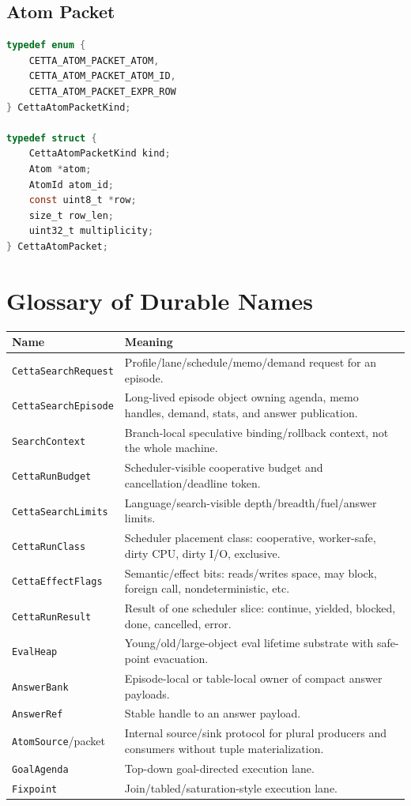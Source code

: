 \documentclass[11pt]{article}
\begin{document}
\subsection{Atom Packet}

\begin{lstlisting}[language=C]
typedef enum {
    CETTA_ATOM_PACKET_ATOM,
    CETTA_ATOM_PACKET_ATOM_ID,
    CETTA_ATOM_PACKET_EXPR_ROW
} CettaAtomPacketKind;

typedef struct {
    CettaAtomPacketKind kind;
    Atom *atom;
    AtomId atom_id;
    const uint8_t *row;
    size_t row_len;
    uint32_t multiplicity;
} CettaAtomPacket;
\end{lstlisting}

\section{Glossary of Durable Names}

\begin{longtable}{>{\raggedright\arraybackslash}p{} >{\raggedright\arraybackslash}p{}}
\toprule
Name & Meaning \\
\midrule
\texttt{CettaSearchRequest} & Profile/lane/schedule/memo/demand request for an episode. \\
\texttt{CettaSearchEpisode} & Long-lived episode object owning agenda, memo handles, demand, stats, and answer publication. \\
\texttt{SearchContext} & Branch-local speculative binding/rollback context, not the whole machine. \\
\texttt{CettaRunBudget} & Scheduler-visible cooperative budget and cancellation/deadline token. \\
\texttt{CettaSearchLimits} & Language/search-visible depth/breadth/fuel/answer limits. \\
\texttt{CettaRunClass} & Scheduler placement class: cooperative, worker-safe, dirty CPU, dirty I/O, exclusive. \\
\texttt{CettaEffectFlags} & Semantic/effect bits: reads/writes space, may block, foreign call, nondeterministic, etc. \\
\texttt{CettaRunResult} & Result of one scheduler slice: continue, yielded, blocked, done, cancelled, error. \\
\texttt{EvalHeap} & Young/old/large-object eval lifetime substrate with safe-point evacuation. \\
\texttt{AnswerBank} & Episode-local or table-local owner of compact answer payloads. \\
\texttt{AnswerRef} & Stable handle to an answer payload. \\
\texttt{AtomSource}/packet & Internal source/sink protocol for plural producers and consumers without tuple materialization. \\
\texttt{GoalAgenda} & Top-down goal-directed execution lane. \\
\texttt{Fixpoint} & Join/tabled/saturation-style execution lane. \\
\bottomrule
\end{longtable}
\end{document}
